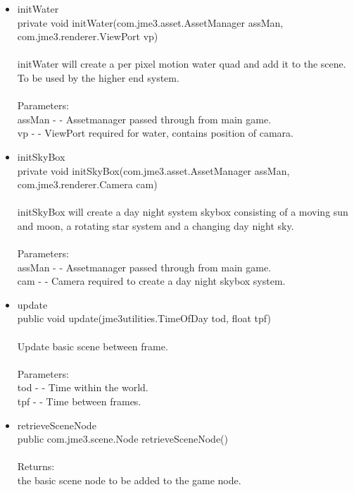\documentclass[letterpaper]{article}
\begin{document}
\begin{itemize}
\begin{itemize}
									\item	initWater \\
											private void initWater(com.jme3.asset.AssetManager assMan, \\
		             com.jme3.renderer.ViewPort vp) \\ \\
											initWater will create a per pixel motion water quad and add it to the scene. To be used by the higher end system. \\ \\
											Parameters: \\
											assMan - - Assetmanager passed through from main game. \\
											vp - - ViewPort required for water, contains position of camara.
									\item	initSkyBox \\
											private void initSkyBox(com.jme3.asset.AssetManager assMan, \\
		              com.jme3.renderer.Camera cam) \\ \\ 
											initSkyBox will create a day night system skybox consisting of a moving sun and moon, a rotating star system and a changing day night sky. \\ \\
											Parameters: \\
											assMan - - Assetmanager passed through from main game. \\
											cam - - Camera required to create a day night skybox system.
									\item	update \\
											public void update(jme3utilities.TimeOfDay tod,
		          float tpf) \\ \\
											Update basic scene between frame. \\ \\
											Parameters: \\
											tod - - Time within the world. \\
											tpf - - Time between frames.
									\item	retrieveSceneNode \\
											public com.jme3.scene.Node retrieveSceneNode() \\ \\
											Returns: \\
											the basic scene node to be added to the game node.
								\end{itemize}
					\end{itemize}
				
\end{document}
